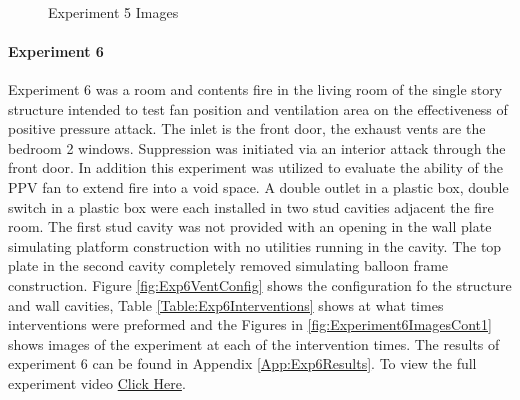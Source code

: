\documentclass{article}
\begin{document}
\begin{figure}[H]
	\ContinuedFloat 
	\centering 
	 \ 
	\caption{Experiment 5 Images}
	\label{fig:Experiment5ImagesCont3} 
\end{figure}

\clearpage

\paragraph{Experiment 6}\mbox{}

Experiment 6 was a room and contents fire in the living room of the single story structure intended to test fan position and ventilation area on the effectiveness of positive pressure attack. The inlet is the front door, the exhaust vents are the bedroom 2 windows. Suppression was initiated via an interior attack through the front door. In addition this experiment was utilized to evaluate the ability of the PPV fan to extend fire into a void space. A double outlet in a plastic box, double switch in a plastic box were each installed in two stud cavities adjacent the fire room. The first stud cavity was not provided with an opening in the wall plate simulating platform construction with no utilities running in the cavity. The top plate in the second cavity completely removed simulating balloon frame construction. Figure \ref{fig:Exp6VentConfig} shows the configuration fo the structure and wall cavities, Table \ref{Table:Exp6Interventions} shows at what times interventions were preformed and the Figures in \ref{fig:Experiment6ImagesCont1} shows images of the experiment at each of the intervention times. The results of experiment 6 can be found in Appendix \ref{App:Exp6Results}. To view the full experiment video \href{https://youtu.be/IDuoI21e-WI}{Click Here}.
\end{document}
